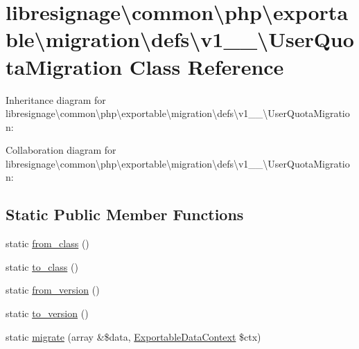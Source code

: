 \hypertarget{classlibresignage_1_1common_1_1php_1_1exportable_1_1migration_1_1defs_1_1v1__1__0_1_1UserQuotaMigration}{}\section{libresignage\textbackslash{}common\textbackslash{}php\textbackslash{}exportable\textbackslash{}migration\textbackslash{}defs\textbackslash{}v1\+\_\+\_\textbackslash{}User\+Quota\+Migration Class Reference}
\label{classlibresignage_1_1common_1_1php_1_1exportable_1_1migration_1_1defs_1_1v1__1__0_1_1UserQuotaMigration}


Inheritance diagram for libresignage\textbackslash{}common\textbackslash{}php\textbackslash{}exportable\textbackslash{}migration\textbackslash{}defs\textbackslash{}v1\+\_\+\_\textbackslash{}User\+Quota\+Migration\+:


Collaboration diagram for libresignage\textbackslash{}common\textbackslash{}php\textbackslash{}exportable\textbackslash{}migration\textbackslash{}defs\textbackslash{}v1\+\_\+\_\textbackslash{}User\+Quota\+Migration\+:
\subsection*{Static Public Member Functions}
\begin{DoxyCompactItemize}
\item 
static \hyperlink{classlibresignage_1_1common_1_1php_1_1exportable_1_1migration_1_1defs_1_1v1__1__0_1_1UserQuotaMigration_a62a360e324642c453ebc35b29d7ccbb1}{from\+\_\+class} ()
\item 
static \hyperlink{classlibresignage_1_1common_1_1php_1_1exportable_1_1migration_1_1defs_1_1v1__1__0_1_1UserQuotaMigration_a52af40bd6e9b89a76a3095ea9a24d22e}{to\+\_\+class} ()
\item 
static \hyperlink{classlibresignage_1_1common_1_1php_1_1exportable_1_1migration_1_1defs_1_1v1__1__0_1_1UserQuotaMigration_a7c039ec545e5f75ef153a8a238603e69}{from\+\_\+version} ()
\item 
static \hyperlink{classlibresignage_1_1common_1_1php_1_1exportable_1_1migration_1_1defs_1_1v1__1__0_1_1UserQuotaMigration_aa19eba7b6a2f247409d5c848a21df7b7}{to\+\_\+version} ()
\item 
static \hyperlink{classlibresignage_1_1common_1_1php_1_1exportable_1_1migration_1_1defs_1_1v1__1__0_1_1UserQuotaMigration_a2d003b20168c0b90db426716b5c4979c}{migrate} (array \&\$data, \hyperlink{classlibresignage_1_1common_1_1php_1_1exportable_1_1ExportableDataContext}{Exportable\+Data\+Context} \$ctx)
\end{DoxyCompactItemize}


